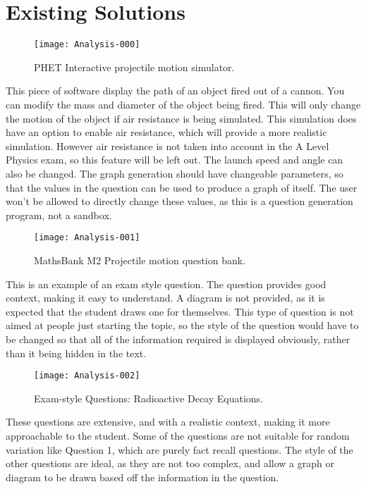 \section{Existing Solutions}
\begin{figure}[h]
	\centering
	\texttt{[image: Analysis-000]}
	\caption[PHET Interactive projectile motion simulator.]{PHET Interactive projectile motion simulator. \autocite{phet}}
	\label{phet}
\end{figure}
This piece of software display the path of an object fired out of a cannon. You can modify the mass and diameter of the object being fired. This will only change the motion of the object if air resistance is being simulated. This simulation does have an option to enable air resistance, which will provide a more realistic simulation. However air resistance is not taken into account in the A Level Physics exam, so this feature will be left out. The launch speed and angle can also be changed. The graph generation should have changeable parameters, so that the values in the question can be used to produce a graph of itself. The user won't be allowed to directly change these values, as this is a question generation program, not a sandbox.
\clearpage
\begin{figure}[h]
	\centering
	\texttt{[image: Analysis-001]}
	\caption[MathsBank M2 Projectile motion question bank.]{MathsBank M2 Projectile motion question bank. \autocite{mb}}
\end{figure}
This is an example of an exam style question. The question provides good context, making it easy to understand. A diagram is not provided, as it is expected that the student draws one for themselves. This type of question is not aimed at people just starting the topic, so the style of the question would have to be changed so that all of the information required is displayed obviously, rather than it being hidden in the text.
\clearpage
\begin{figure}[h]
	\centering
	\texttt{[image: Analysis-002]}
	\caption[Exam-style Questions: Radioactive Decay Equations.]{Exam-style Questions: Radioactive Decay Equations. \autocite{scool}}
\end{figure}
These questions are extensive, and with a realistic context, making it more approachable to the student. Some of the questions are not suitable for random variation like Question 1, which are purely fact recall questions. The style of the other questions are ideal, as they are not too complex, and allow a graph or diagram to be drawn based off the information in the question.
